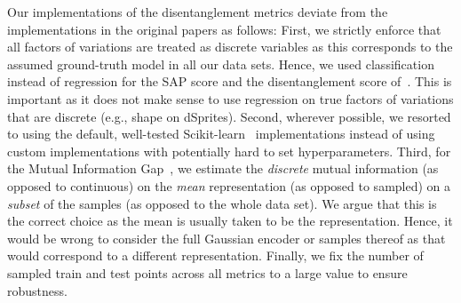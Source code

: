 Our implementations of the disentanglement metrics deviate from the implementations in the original papers as follows:
First, we strictly enforce that all factors of variations are treated as discrete variables as this corresponds to the assumed ground-truth model in all our data sets.
Hence, we used classification instead of regression for the SAP score and the disentanglement score of~\citep{eastwood2018framework}.
This is important as it does not make sense to use regression on true factors of variations that are discrete (e.g., shape on dSprites).
Second, wherever possible, we resorted to using the default, well-tested Scikit-learn~\citep{scikitlearn} implementations instead of using custom implementations with potentially hard to set hyperparameters.
Third, for the Mutual Information Gap~\citep{chen2018isolating}, we estimate the \textit{discrete} mutual information (as opposed to continuous) on the \textit{mean} representation (as opposed to sampled) on a \textit{subset} of the samples (as opposed to the whole data set).
We argue that this is the correct choice as the mean is usually taken to be the representation.
Hence, it would be wrong to consider the full Gaussian encoder or samples thereof as that would correspond to a different representation.
Finally, we fix the number of sampled train and test points across all metrics to a large value to ensure robustness. 

